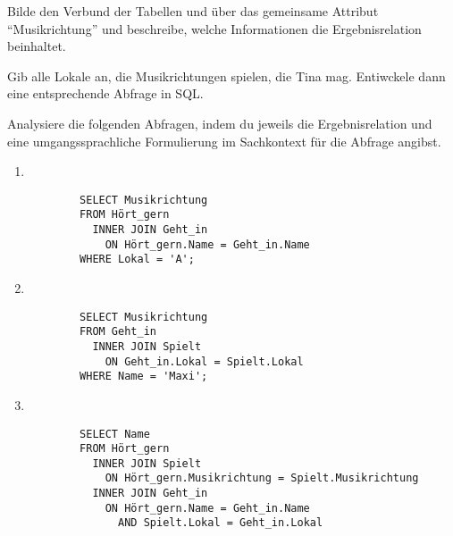 \documentclass[10pt, a4paper, ngerman]{arbeitsblatt}
\begin{document}
\begin{aufgabe}
\begin{enuma}
	\item Bilde den Verbund der Tabellen  und  über das gemeinsame Attribut \enquote{Musikrichtung} und beschreibe, welche Informationen die Ergebnisrelation beinhaltet.

	\item Gib alle Lokale an, die Musikrichtungen spielen, die Tina mag. Entiwckele dann eine entsprechende Abfrage in SQL.

	\item Analysiere die folgenden Abfragen, indem du jeweils die Ergebnisrelation und eine umgangssprachliche Formulierung im Sachkontext für die Abfrage angibst.
	\begin{enumerate}
		\item ~\\[-3em]\begin{verbatim}
		SELECT Musikrichtung
		FROM Hört_gern
		  INNER JOIN Geht_in
		    ON Hört_gern.Name = Geht_in.Name
		WHERE Lokal = 'A';
		\end{verbatim}

		\item ~\\[-3em]\begin{verbatim}
		SELECT Musikrichtung
		FROM Geht_in
		  INNER JOIN Spielt
			ON Geht_in.Lokal = Spielt.Lokal
		WHERE Name = 'Maxi';
		\end{verbatim}

		\item ~\\[-3em]\begin{verbatim}
		SELECT Name
		FROM Hört_gern
		  INNER JOIN Spielt
			ON Hört_gern.Musikrichtung = Spielt.Musikrichtung
		  INNER JOIN Geht_in
		    ON Hört_gern.Name = Geht_in.Name
			  AND Spielt.Lokal = Geht_in.Lokal
		\end{verbatim}
	\end{enumerate}
\end{enuma}
\end{aufgabe}
\end{document}
